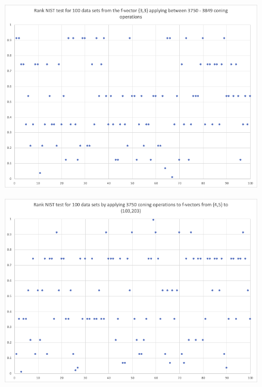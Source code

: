 \documentclass[oneside,12pt]{amsart}
\theoremstyle{definition}
\numberwithin{equation}{section}
\begin{document}
\begin{figure}[h!]
\centering
\includegraphics[scale=.5]{./charts/Rank_3_3.png}
\label{fig:rank33}
\end{figure}

\begin{figure}[h!]
\centering
\includegraphics[scale=.5]{./charts/Rank_4_5.png}
\label{fig:rank45}
\end{figure}
\end{document}
